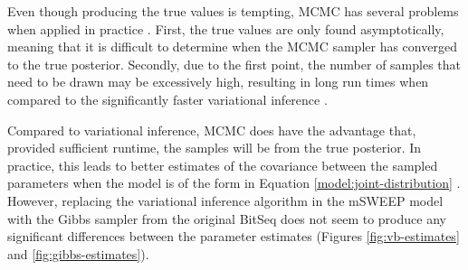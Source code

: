 \documentclass[officiallayout]{tktla}
\begin{document}
Even though producing the true values is tempting, MCMC has several
problems when applied in practice \citep{blei2017variational}. First,
the true values are only found asymptotically, meaning that it is
difficult to determine when the MCMC sampler has converged to the true
posterior. Secondly, due to the first point, the number of samples
that need to be drawn may be excessively high, resulting in long run
times when compared to the significantly faster variational inference
\citep{blei2017variational}.

Compared to variational inference, MCMC does have the advantage that,
provided sufficient runtime, the samples will be from the true
posterior. In practice, this leads to better estimates of the
covariance between the sampled parameters when the model is of the
form in Equation \eqref{model:joint-distribution}
\citep{hensman2015fast}. However, replacing the variational inference
algorithm in the mSWEEP model with the Gibbs sampler from the original
BitSeq \citep{glaus2012identifying} does not seem to produce any
significant differences between the parameter estimates (Figures
\ref{fig:vb-estimates} and \ref{fig:gibbs-estimates}).
\end{document}
